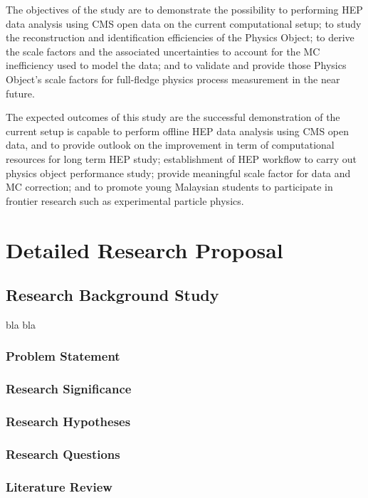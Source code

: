 \documentclass[bibliography=totoc]{article}
\begin{document}
The objectives of the study are to demonstrate the possibility to performing HEP data analysis using CMS open data on the current computational setup; to study the reconstruction and identification efficiencies of the Physics Object; to derive the scale factors and the associated uncertainties to account for the MC inefficiency used to model the data; and to validate and provide those Physics Object's scale factors for full-fledge physics process measurement in the near future.

The expected outcomes of this study are the successful demonstration of the current setup is capable to perform offline HEP data analysis using CMS open data, and to provide outlook on the improvement in term of computational resources for long term HEP study; establishment of HEP workflow to carry out physics object performance study; provide meaningful scale factor for data and MC correction; and to promote young Malaysian students to participate in frontier research such as experimental particle physics.

\section{Detailed Research Proposal}
\subsection{Research Background Study}

bla bla

\subsubsection{Problem Statement}

\subsubsection{Research Significance}

\subsubsection{Research Hypotheses}

\subsubsection{Research Questions}

\subsubsection{Literature Review}
\end{document}

